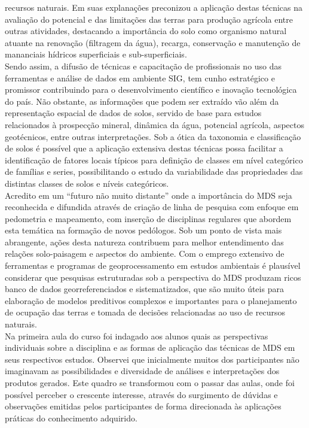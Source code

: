 recursos naturais. Em suas explanações preconizou a aplicação destas técnicas na avaliação do potencial e das limitações das terras para produção agrícola entre outras atividades, destacando a importância do solo como organismo natural atuante na renovação (filtragem da água), recarga, conservação e manutenção de mananciais hídricos superficiais e sub-superficiais.\\
Sendo assim, a difusão de técnicas e capacitação de profissionais no uso das ferramentas e análise de dados em ambiente SIG, tem cunho estratégico e promissor contribuindo para o desenvolvimento científico e inovação tecnológica do país. Não obstante, as informações que podem ser extraído vão além da representação espacial de dados de solos, servido de base para estudos relacionados à prospecção mineral, dinâmica da água, potencial agrícola, aspectos geotécnicos, entre outras interpretações. Sob a ótica da taxonomia e classificação de solos é possível que a aplicação extensiva destas técnicas possa facilitar a identificação de fatores locais típicos para definição de classes em nível categórico de famílias e series, possibilitando o estudo da variabilidade das propriedades das distintas classes de solos e níveis categóricos.\\
Acredito em um ``futuro não muito distante'' onde a importância do MDS seja reconhecida e difundida através de criação de linha de pesquisa com enfoque em pedometria e mapeamento, com inserção de disciplinas regulares que abordem esta temática na formação de novos pedólogos. Sob um ponto de vista mais abrangente, ações desta natureza contribuem para melhor entendimento das relações solo-paisagem e aspectos do ambiente. Com o emprego extensivo de ferramentas e programas de geoprocessamento em estudos ambientais é plausível considerar que pesquisas estruturadas sob a perspectiva do MDS produzam ricos banco de dados georreferenciados e sistematizados, que são muito úteis para elaboração de modelos preditivos complexos e importantes para o planejamento de ocupação das terras e tomada de decisões relacionadas ao uso de recursos naturais.\\
Na primeira aula do curso foi indagado aos alunos quais as perspectivas individuais sobre a disciplina e as formas de aplicação das técnicas de MDS em seus respectivos estudos. Observei que inicialmente muitos dos participantes não imaginavam as possibilidades e diversidade de análises e interpretações dos produtos gerados. Este quadro se transformou com o passar das aulas, onde foi possível perceber o crescente interesse, através do surgimento de dúvidas e observações emitidas pelos participantes de forma direcionada às aplicações práticas do conhecimento adquirido.\\
